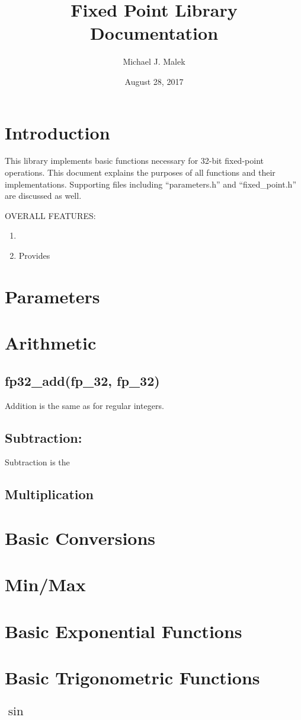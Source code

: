 \documentclass{article}
\title{Fixed Point Library Documentation}
\author{Michael J. Malek}
\date{August 28, 2017}
\begin{document}
\maketitle


\tableofcontents

\section{Introduction}

This library implements basic functions necessary for 32-bit fixed-point operations. 
This document explains the purposes  of all functions and their implementations. Supporting
files including ``parameters.h'' and ``fixed_point.h'' are discussed as well. 

OVERALL FEATURES:

\begin{enumerate}

\item 

\item Provides 

\end{enumerate}

\section{Parameters}



\section{Arithmetic}

\subsection{fp32\_add(fp\_32, fp\_32)}

Addition is the same as for regular integers.

\subsection{Subtraction: }

Subtraction is the 

\subsection{Multiplication}

\section{Basic Conversions}

\section{Min/Max}

\section{Basic Exponential Functions}

\section{Basic Trigonometric Functions}

\subsection{$\sin$}
\end{document}
